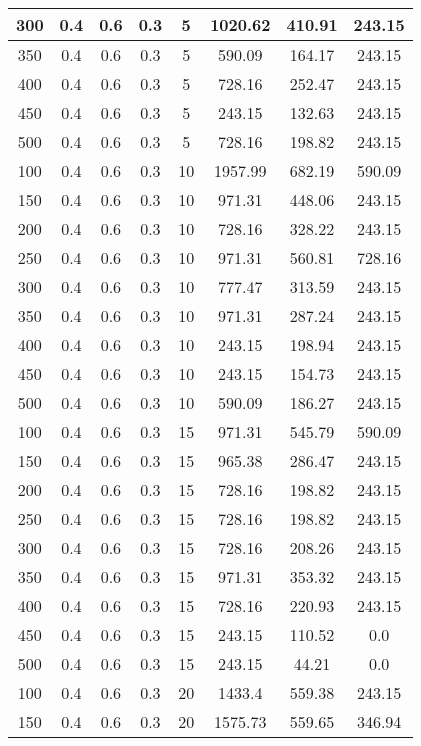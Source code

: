 \documentclass[a4paper, 12pt]{extreport}
\begin{document}
\begin{itemize}
\begin{longtable}{|c|c|c|c|c|c|c|c|}
			300 & 0.4 & 0.6 & 0.3 & 5 & 1020.62 & 410.91 & 243.15 \\\hline
			350 & 0.4 & 0.6 & 0.3 & 5 & 590.09 & 164.17 & 243.15 \\\hline
			400 & 0.4 & 0.6 & 0.3 & 5 & 728.16 & 252.47 & 243.15 \\\hline
			450 & 0.4 & 0.6 & 0.3 & 5 & 243.15 & 132.63 & 243.15 \\\hline
			500 & 0.4 & 0.6 & 0.3 & 5 & 728.16 & 198.82 & 243.15 \\\hline
			100 & 0.4 & 0.6 & 0.3 & 10 & 1957.99 & 682.19 & 590.09 \\\hline
			150 & 0.4 & 0.6 & 0.3 & 10 & 971.31 & 448.06 & 243.15 \\\hline
			200 & 0.4 & 0.6 & 0.3 & 10 & 728.16 & 328.22 & 243.15 \\\hline
			250 & 0.4 & 0.6 & 0.3 & 10 & 971.31 & 560.81 & 728.16 \\\hline
			300 & 0.4 & 0.6 & 0.3 & 10 & 777.47 & 313.59 & 243.15 \\\hline
			350 & 0.4 & 0.6 & 0.3 & 10 & 971.31 & 287.24 & 243.15 \\\hline
			400 & 0.4 & 0.6 & 0.3 & 10 & 243.15 & 198.94 & 243.15 \\\hline
			450 & 0.4 & 0.6 & 0.3 & 10 & 243.15 & 154.73 & 243.15 \\\hline
			500 & 0.4 & 0.6 & 0.3 & 10 & 590.09 & 186.27 & 243.15 \\\hline
			100 & 0.4 & 0.6 & 0.3 & 15 & 971.31 & 545.79 & 590.09 \\\hline
			150 & 0.4 & 0.6 & 0.3 & 15 & 965.38 & 286.47 & 243.15 \\\hline
			200 & 0.4 & 0.6 & 0.3 & 15 & 728.16 & 198.82 & 243.15 \\\hline
			250 & 0.4 & 0.6 & 0.3 & 15 & 728.16 & 198.82 & 243.15 \\\hline
			300 & 0.4 & 0.6 & 0.3 & 15 & 728.16 & 208.26 & 243.15 \\\hline
			350 & 0.4 & 0.6 & 0.3 & 15 & 971.31 & 353.32 & 243.15 \\\hline
			400 & 0.4 & 0.6 & 0.3 & 15 & 728.16 & 220.93 & 243.15 \\\hline
			450 & 0.4 & 0.6 & 0.3 & 15 & 243.15 & 110.52 & 0.0 \\\hline
			500 & 0.4 & 0.6 & 0.3 & 15 & 243.15 & 44.21 & 0.0 \\\hline
			100 & 0.4 & 0.6 & 0.3 & 20 & 1433.4 & 559.38 & 243.15 \\\hline
			150 & 0.4 & 0.6 & 0.3 & 20 & 1575.73 & 559.65 & 346.94 \\\hline

\end{longtable}
\end{itemize}
\end{document}
